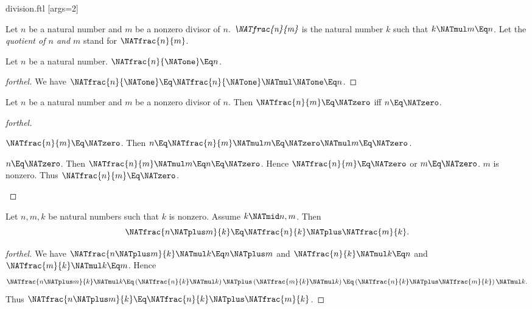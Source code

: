 \documentclass{stex}
\begin{document}
\begin{smodule}{division.ftl}
[args=2]{}

\begin{definition}[forthel]
  Let $n$ be a natural number and $m$ be a nonzero divisor of $n$.
  $\emph{\NATfrac{n}{m}}$ is the natural number $k$ such that $k \NATmul m \Eq n$.
  Let the \emph{quotient of $n$ and $m$} stand for $\NATfrac{n}{m}$.
\end{definition}

\begin{proposition}[forthel]
  Let $n$ be a natural number.
  $\NATfrac{n}{\NATone} \Eq n$.
\end{proposition}
\begin{proof}[forthel]
  We have $\NATfrac{n}{\NATone}
    \Eq \NATfrac{n}{\NATone} \NATmul \NATone
    \Eq n$.
\end{proof}

\begin{proposition}[forthel]
  Let $n$ be a natural number and $m$ be a nonzero divisor of $n$.
  Then $\NATfrac{n}{m} \Eq \NATzero$ iff $n \Eq \NATzero$.
\end{proposition}
\begin{proof}[forthel]
  \begin{case}{$\NATfrac{n}{m} \Eq \NATzero$.}
    Then $n
      \Eq \NATfrac{n}{m} \NATmul m
      \Eq \NATzero \NATmul m
      \Eq \NATzero$.
  \end{case}

  \begin{case}{$n \Eq \NATzero$.}
    Then $\NATfrac{n}{m} \NATmul m
      \Eq n
      \Eq \NATzero$.
    Hence $\NATfrac{n}{m} \Eq \NATzero$ or $m \Eq \NATzero$.
    $m$ is nonzero.
    Thus $\NATfrac{n}{m} \Eq \NATzero$.
  \end{case}
\end{proof}

\begin{proposition}[forthel]
  Let $n, m, k$ be natural numbers such that $k$ is nonzero.
  Assume $k \NATmid n,m$.
  Then \[\NATfrac{n \NATplus m}{k} \Eq \NATfrac{n}{k} \NATplus \NATfrac{m}{k}.\]
\end{proposition}
\begin{proof}[forthel]
  We have $\NATfrac{n \NATplus m}{k} \NATmul k \Eq n \NATplus m$ and $\NATfrac{n}{k} \NATmul k \Eq n$ and $\NATfrac{m}{k} \NATmul k \Eq m$.
  Hence
  \[  \NATfrac{n \NATplus m}{k} \NATmul k
      \Eq \left( \NATfrac{n}{k} \NATmul k \right) \NATplus \left( \NATfrac{m}{k} \NATmul k \right)
      \Eq \left( \NATfrac{n}{k} \NATplus \NATfrac{m}{k} \right) \NATmul k. \]
  Thus $\NATfrac{n \NATplus m}{k} \Eq \NATfrac{n}{k} \NATplus \NATfrac{m}{k}$.
\end{proof}


\end{smodule}
\end{document}

